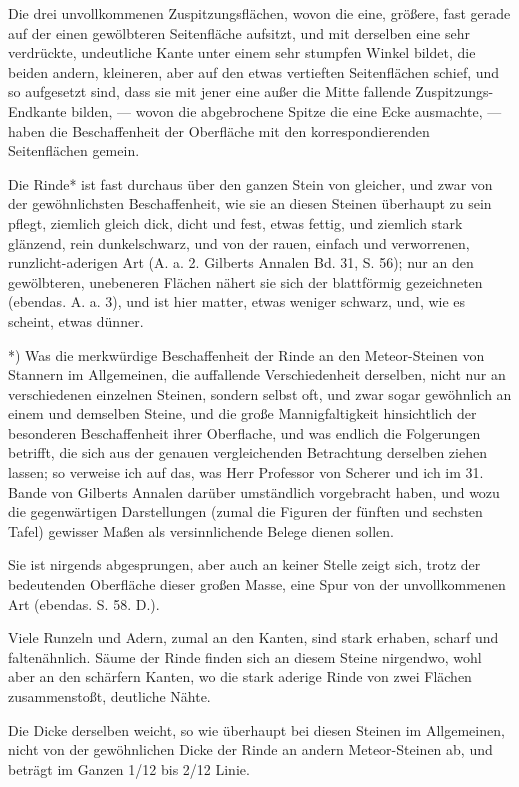 \documentclass[a4paper, 11pt, oneside, german]{article}
\begin{document}
Die drei unvollkommenen Zuspitzungsflächen, wovon die eine, größere, fast gerade auf der einen gewölbteren Seitenfläche aufsitzt, und mit derselben eine sehr verdrückte, undeutliche Kante unter einem sehr stumpfen Winkel bildet, die beiden andern, kleineren, aber auf den etwas vertieften Seitenflächen schief, und so aufgesetzt sind, dass sie mit jener eine außer die Mitte fallende Zuspitzungs-Endkante bilden, --- wovon die abgebrochene Spitze die eine Ecke ausmachte, --- haben die Beschaffenheit der Oberfläche mit den korrespondierenden Seitenflächen gemein.

Die Rinde* ist fast durchaus über den ganzen Stein von gleicher, und zwar von der gewöhnlichsten Beschaffenheit, wie sie an diesen Steinen überhaupt zu sein pflegt, ziemlich gleich dick, dicht und fest, etwas fettig, und ziemlich stark glänzend, rein dunkelschwarz, und von der rauen, einfach und verworrenen, runzlicht-aderigen Art (A. a. 2. Gilberts Annalen Bd. 31, S. 56); nur an den gewölbteren, unebeneren Flächen nähert sie sich der blattförmig gezeichneten (ebendas. A. a. 3), und ist hier matter, etwas weniger schwarz, und, wie es scheint, etwas dünner.

*) Was die merkwürdige Beschaffenheit der Rinde an den Meteor-Steinen von Stannern im Allgemeinen, die auffallende Verschiedenheit derselben, nicht nur an verschiedenen einzelnen Steinen, sondern selbst oft, und zwar sogar gewöhnlich an einem und demselben Steine, und die große Mannigfaltigkeit hinsichtlich der besonderen Beschaffenheit ihrer Oberflache, und was endlich die Folgerungen betrifft, die sich aus der genauen vergleichenden Betrachtung derselben ziehen lassen; so verweise ich auf das, was Herr Professor von Scherer und ich im 31. Bande von Gilberts Annalen darüber umständlich vorgebracht haben, und wozu die gegenwärtigen Darstellungen (zumal die Figuren der fünften und sechsten Tafel) gewisser Maßen als versinnlichende Belege dienen sollen.

Sie ist nirgends abgesprungen, aber auch an keiner Stelle zeigt sich, trotz der bedeutenden Oberfläche dieser großen Masse, eine Spur von der unvollkommenen Art (ebendas. S. 58. D.).

Viele Runzeln und Adern, zumal an den Kanten, sind stark erhaben, scharf und faltenähnlich. Säume der Rinde finden sich an diesem Steine nirgendwo, wohl aber an den schärfern Kanten, wo die stark aderige Rinde von zwei Flächen zusammenstoßt, deutliche Nähte.

Die Dicke derselben weicht, so wie überhaupt bei diesen Steinen im Allgemeinen, nicht von der gewöhnlichen Dicke der Rinde an andern Meteor-Steinen ab, und beträgt im Ganzen 1/12 bis 2/12 Linie.
\end{document}
